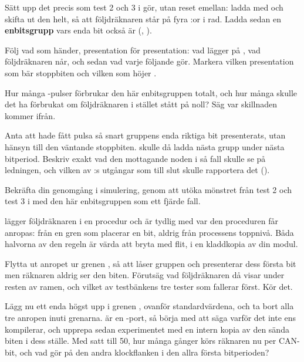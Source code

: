Sätt upp det precis som test 2 och 3 i  gör, utan reset emellan: ladda
 med  och skifta ut den helt, så att följdräknaren står på fyra
:or i rad. Ladda sedan en \textbf{enbitsgrupp} vars enda bit också är 
(, ).

 Följ vad som händer, presentation för presentation: vad  lägger på
, vad följdräknaren når, och sedan vad varje följande  gör. Markera vilken
presentation som bär stoppbiten och vilken som höjer .

 Hur många -pulser förbrukar den här enbitsgruppen totalt, och hur många skulle
det ha förbrukat om följdräknaren i stället stått på noll? Säg var skillnaden kommer ifrån.

 Anta att  hade fått pulsa så snart gruppens enda riktiga bit presenterats, utan
hänsyn till den väntande stoppbiten.  skulle då ladda nästa grupp under nästa
bitperiod. Beskriv exakt vad den mottagande noden i så fall skulle se på ledningen, och vilken av
:s utgångar som till slut skulle rapportera det ().

 Bekräfta din genomgång i simulering, genom att utöka mönstret från test 2 och test 3 i
 med den här enbitsgruppen som ett fjärde fall.

\label{c14:ex:trackrun}
 lägger följdräknaren i en procedur och är tydlig med var den proceduren får
anropas: från en gren som placerar en bit, aldrig från processens toppnivå. Båda halvorna av den
regeln är värda att bryta med flit, i en kladdkopia av din modul.

 Flytta ut anropet  ur grenen , så att 
låser gruppen och presenterar dess första bit men räknaren aldrig ser den biten. Förutsäg vad
följdräknaren då visar under resten av ramen, och vilket av testbänkens tre tester som fallerar
först. Kör det.

 Lägg nu ett enda  högst upp i grenen
, ovanför standardvärdena, och ta bort alla tre anropen inuti
grenarna.  är en -port, så börja med att säga varför det inte ens kompilerar,
och upprepa sedan experimentet med en intern kopia av den sända biten i dess ställe. Med
 satt till 50, hur många gånger körs räknaren nu per CAN-bit, och vad gör
 på den andra klockflanken i den allra första bitperioden?

